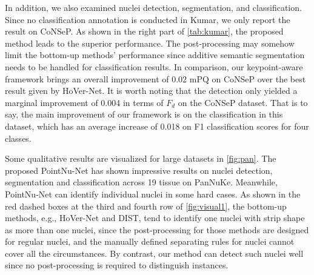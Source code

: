 \documentclass[lettersize,journal]{IEEEtran}
\begin{document}
In addition, we also examined nuclei detection, segmentation, and classification. Since no classification annotation is conducted in Kumar, we only report the result on  CoNSeP. As shown in the right part of \autoref{tab:kumar}, the proposed method leads to the  superior performance. The post-processing may somehow limit the bottom-up methods' performance since additive semantic segmentation needs to be handled  for classification results. In comparison, our keypoint-aware framework brings an overall improvement of 0.02 mPQ on CoNSeP over the best result given by HoVer-Net. It is worth noting that the detection only yielded a marginal improvement of 0.004 in terms of $F_d$ on the CoNSeP dataset. That is to say, the main improvement of our framework is on the classification in this dataset, which has an average increase of 0.018 on F1 classification scores for four classes.  

Some qualitative results are visualized for large datasets in \autoref{fig:pan}. The proposed PointNu-Net has shown impressive results on nuclei detection, segmentation and classification across 19 tissue on PanNuKe. Meanwhile, PointNu-Net can identify individual nuclei in some hard cases. As shown in the red dashed boxes at the third and fourth row of \autoref{fig:visual1}, the bottom-up methods, e.g., HoVer-Net and DIST, tend to identify one nuclei with strip shape as more than one nuclei, since the post-processing for those methods are designed for regular nuclei, and the manually defined separating rules for nuclei cannot cover all the circumstances. By contrast, our method can detect such nuclei well since no post-processing is required to distinguish instances.
\end{document}
